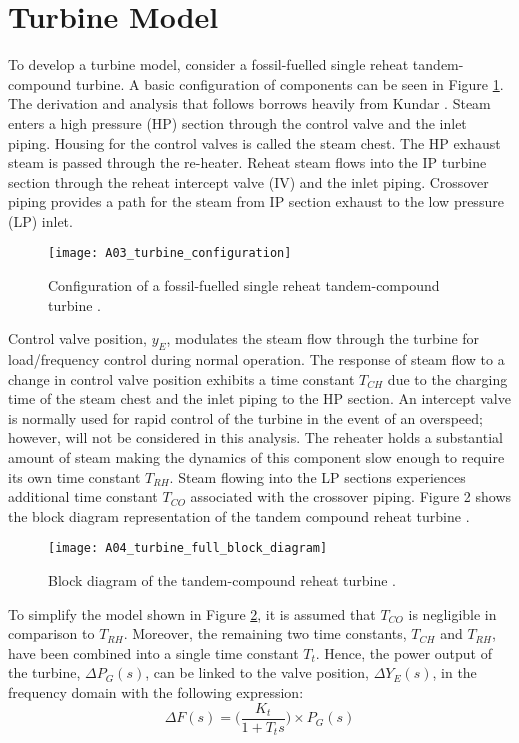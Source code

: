 \section{Turbine Model}\label{app:turbine_model}
To develop a turbine model, consider a fossil-fuelled single reheat tandem-compound turbine. A basic configuration of components can be seen in Figure \ref{fig:A03_turbine_configuration}. The derivation and analysis that follows borrows heavily from Kundar \cite{Kundur1994}. Steam enters a high pressure (HP) section through the control valve and the inlet piping. Housing for the control valves is called the steam chest. The HP exhaust steam is passed through the re-heater. Reheat steam flows into the IP turbine section through the reheat intercept valve (IV) and the inlet piping. Crossover piping provides a path for the steam from IP section exhaust to the low pressure (LP) inlet.

\begin{figure}
	\centering
	\texttt{[image: A03\_turbine\_configuration]}
	\caption[Reheat tandem-compound turbine configuration]{Configuration of a fossil-fuelled single reheat tandem-compound turbine \cite{Kundur1994}.}
	\label{fig:A03_turbine_configuration}
\end{figure}

Control valve position, $y_E$, modulates the steam flow through the turbine for load/frequency control during normal operation. The response of steam flow to a change in control valve position exhibits a time constant $T_{CH}$ due to the charging time of the steam chest and the inlet piping to the HP section. An intercept valve is normally used for rapid control of the turbine in the event of an overspeed; however, will not be considered in this analysis. The reheater holds a substantial amount of steam making the dynamics of this component slow enough to require its own time constant $T_{RH}$. Steam flowing into the LP sections experiences additional time constant $T_{CO}$ associated with the crossover piping. Figure 2 shows the block diagram representation of the tandem compound reheat turbine \cite{Kundur1994}.

\begin{figure}
	\centering
	\texttt{[image: A04\_turbine\_full\_block\_diagram]}
	\caption[Tandem-compound reheat turbine model]{Block diagram of the tandem-compound reheat turbine \cite{Kundur1994}.}
	\label{fig:A04_turbine_full_block_diagram}
\end{figure}

To simplify the model shown in Figure \ref{fig:A04_turbine_full_block_diagram}, it is assumed that $T_{CO}$ is negligible in comparison to $T_{RH}$. Moreover, the remaining two time constants, $T_{CH}$ and $T_{RH}$, have been combined into a single time constant $T_t$. Hence, the power output of the turbine, $\Delta P_G(s)$, can be linked to the valve position, $\Delta Y_E(s)$, in the frequency domain with the following expression:
\begin{equation}
	\Delta F(s) = \bigg( \frac{K_t}{1 + T_t s} \bigg) \times P_G(s) \label{eq:A10}
\end{equation}

